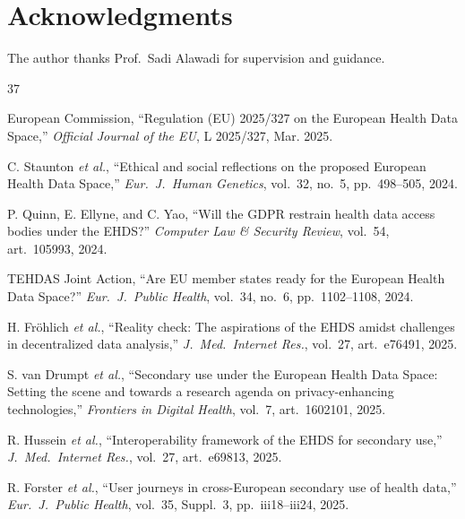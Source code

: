 \documentclass[conference]{IEEEtran}
\begin{document}
\section*{Acknowledgments}
The author thanks Prof.~Sadi Alawadi for supervision and guidance.



\begin{thebibliography}{37}

European Commission, ``Regulation (EU) 2025/327 on the European Health Data Space,'' \textit{Official Journal of the EU}, L 2025/327, Mar. 2025.

C. Staunton \textit{et al.}, ``Ethical and social reflections on the proposed European Health Data Space,'' \textit{Eur.~J.~Human Genetics}, vol.~32, no.~5, pp.~498--505, 2024.

P. Quinn, E. Ellyne, and C. Yao, ``Will the GDPR restrain health data access bodies under the EHDS?'' \textit{Computer Law \& Security Review}, vol.~54, art.~105993, 2024.

TEHDAS Joint Action, ``Are EU member states ready for the European Health Data Space?'' \textit{Eur.~J.~Public Health}, vol.~34, no.~6, pp.~1102--1108, 2024.

H. Fr\"ohlich \textit{et al.}, ``Reality check: The aspirations of the EHDS amidst challenges in decentralized data analysis,'' \textit{J.~Med.~Internet Res.}, vol.~27, art.~e76491, 2025.

S. van Drumpt \textit{et al.}, ``Secondary use under the European Health Data Space: Setting the scene and towards a research agenda on privacy-enhancing technologies,'' \textit{Frontiers in Digital Health}, vol.~7, art.~1602101, 2025.

R. Hussein \textit{et al.}, ``Interoperability framework of the EHDS for secondary use,'' \textit{J.~Med.~Internet Res.}, vol.~27, art.~e69813, 2025.

R. Forster \textit{et al.}, ``User journeys in cross-European secondary use of health data,'' \textit{Eur.~J.~Public Health}, vol.~35, Suppl.~3, pp.~iii18--iii24, 2025.


\end{thebibliography}
\end{document}

